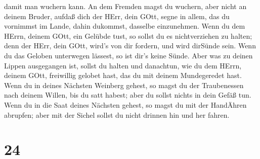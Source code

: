 damit man wuchern kann.  An dem Fremden magst du wuchern,
aber nicht an deinem Bruder, aufdaß dich der HErr, dein GOtt, segne in
allem, das du vornimmst im Lande, dahin dukommst, dasselbe einzunehmen.
 Wenn du dem HErrn, deinem GOtt, ein Gelübde tust, so
sollst du es nichtverziehen zu halten; denn der HErr, dein GOtt, wird's
von dir fordern, und wird dirSünde sein.  Wenn du das
Geloben unterwegen lässest, so ist dir's keine Sünde.  Aber
was zu deinen Lippen ausgegangen ist, sollst du halten und danachtun,
wie du dem HErrn, deinem GOtt, freiwillig gelobet hast, das du mit
deinem Mundegeredet hast.  Wenn du in deines Nächsten
Weinberg gehest, so magst du der Traubenessen nach deinem Willen, bis du
satt habest; aber du sollst nichts in dein Gefäß tun.  Wenn
du in die Saat deines Nächsten gehest, so magst du mit der HandÄhren
abrupfen; aber mit der Sichel sollst du nicht drinnen hin und her
fahren.

\hypertarget{section-23}{%
\section{24}\label{section-23}}

